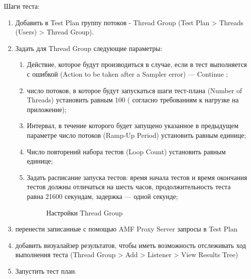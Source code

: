 Шаги теста:

\begin{enumerate}
\item Добавить в Test Plan группу потоков - Thread Group (Test Plan > Threads (Users) > Thread Group).
\item Задать для Thread Group следующие параметры:

\begin{enumerate}
\item Действие, которое будут производиться в случае, если в тест выполняется с ошибкой
(Action to be taken after a Sampler error) --- Continue ;
\item число потоков, в которое будут запускаться шаги тест-плана (Number of Threads) установить равным 100 (
согласно требованиям к нагрузке на приложение);
\item Интервал, в течение которого будет запущено указанное в предыдущем параметре
число потоков (Ramp-Up Period) установить равным единице;
\item Число повторений набора тестов (Loop Count) установить равным единице;
\item Задать расписание запуска тестов: время начала тестов и время окончания тестов должны отличаться на
шесть часов, продолжительность теста равна 21600 секундам, задержка --- одной секунде;

\begin{figure}[ht]
\caption{Настройки Thread Group}
\label{ris:threadParams.png}
\end{figure}

\end{enumerate}

\item перенести записанные с помощью AMF Proxy Server запросы в Test Plan
\item добавить визуалайзер результатов, чтобы иметь возможность отслеживать ход выполнения теста (Thread Group >
Add > Listener > View Results Tree)
\item Запустить тест план.
\end{enumerate}

